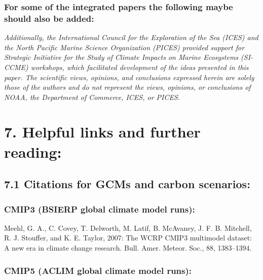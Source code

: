 \documentclass[
]{article}
\begin{document}
\hypertarget{for-some-of-the-integrated-papers-the-following-maybe-should-also-be-added}{%
\subsubsection{For some of the integrated papers the following maybe
should also be
added:}\label{for-some-of-the-integrated-papers-the-following-maybe-should-also-be-added}}

\emph{Additionally, the International Council for the Exploration of the
Sea (ICES) and the North Pacific Marine Science Organization (PICES)
provided support for Strategic Initiative for the Study of Climate
Impacts on Marine Ecosystems (SI-CCME) workshops, which facilitated
development of the ideas presented in this paper. The scientific views,
opinions, and conclusions expressed herein are solely those of the
authors and do not represent the views, opinions, or conclusions of
NOAA, the Department of Commerce, ICES, or PICES.}

\hypertarget{helpful-links-and-further-reading}{%
\section{7. Helpful links and further
reading:}\label{helpful-links-and-further-reading}}

\hypertarget{citations-for-gcms-and-carbon-scenarios}{%
\subsection{7.1 Citations for GCMs and carbon
scenarios:}\label{citations-for-gcms-and-carbon-scenarios}}

\hypertarget{cmip3-bsierp-global-climate-model-runs}{%
\subsubsection{CMIP3 (BSIERP global climate model
runs):}\label{cmip3-bsierp-global-climate-model-runs}}

Meehl, G. A., C. Covey, T. Delworth, M. Latif, B. McAvaney, J. F. B.
Mitchell, R. J. Stouffer, and K. E. Taylor, 2007: The WCRP CMIP3
multimodel dataset: A new era in climate change research. Bull. Amer.
Meteor. Soc., 88, 1383--1394.

\hypertarget{cmip5-aclim-global-climate-model-runs}{%
\subsubsection{CMIP5 (ACLIM global climate model
runs):}\label{cmip5-aclim-global-climate-model-runs}}
\end{document}
